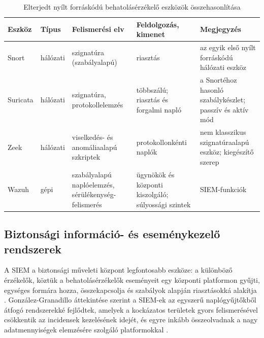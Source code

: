 \begin{table}[H]
    \centering
    \caption{Elterjedt nyílt forráskódú behatolásérzékelő eszközök összehasonlítása}
    \label{tab:ids-eszkozok}
    \small
    \begin{tabular}{|L{1.7cm}|L{1.6cm}|L{3.4cm}|L{3.1cm}|L{3.1cm}|}
        \hline
        \textbf{Eszköz} & \textbf{Típus} & \textbf{Felismerési elv} & \textbf{Feldolgozás, kimenet} & \textbf{Megjegyzés} \\ \hline
        Snort & hálózati & szignatúra (szabályalapú) & riasztás & az egyik első nyílt forráskódú hálózati eszköz \\ \hline
        Suricata & hálózati & szignatúra, protokollelemzés & többszálú; riasztás és forgalmi napló & a Snortéhoz hasonló szabálykészlet; passzív és aktív mód \\ \hline
        Zeek & hálózati & viselkedés- és anomáliaalapú szkriptek & protokollonkénti naplók & nem klasszikus szignatúraalapú eszköz; kiegészítő szerep \\ \hline
        Wazuh & gépi & szabályalapú naplóelemzés, sérülékenység-felismerés & ügynökök és központi kiszolgáló; súlyossági szintek & SIEM-funkciók \\ \hline
    \end{tabular}
\end{table}

\subsection{Biztonsági információ- és eseménykezelő rendszerek}\label{sec:siem}
A \ac{SIEM} a biztonsági műveleti központ legfontosabb eszköze: a különböző érzékelők, köztük a behatolásérzékelők eseményeit egy központi platformon gyűjti, egységes formára hozza, összekapcsolja és szabályok alapján riasztásokká alakítja \cite{gonzalez2021siem}. González-Granadillo áttekintése szerint a \ac{SIEM}-ek az egyszerű naplógyűjtőkből átfogó rendszerekké fejlődtek, amelyek a kockázatos területek gyors felismerésével csökkentik az incidensek kezelésének idejét, és egyre inkább összeolvadnak a nagy adatmennyiségek elemzésére szolgáló platformokkal \cite{gonzalez2021siem}.


